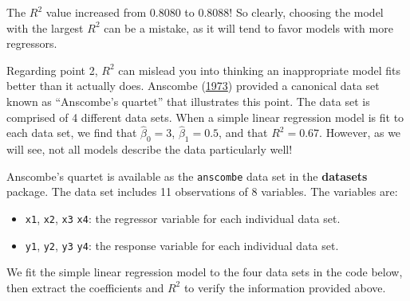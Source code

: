 \documentclass[
]{book}
\providecommand{\tightlist}{%
  \setlength{\itemsep}{0pt}\setlength{\parskip}{0pt}}
\theoremstyle{definition}
\theoremstyle{definition}
\theoremstyle{definition}
\theoremstyle{definition}
\theoremstyle{remark}
\begin{document}
The \(R^2\) value increased from 0.8080 to 0.8088! So clearly, choosing the model with the largest \(R^2\) can be a mistake, as it will tend to favor models with more regressors.

Regarding point 2, \(R^2\) can mislead you into thinking an inappropriate model fits better than it actually does. Anscombe (\protect\hyperlink{ref-anscombe1973graphs}{1973}) provided a canonical data set known as ``Anscombe's quartet'' that illustrates this point. The data set is comprised of 4 different data sets. When a simple linear regression model is fit to each data set, we find that \(\hat{\beta}_0=3\), \(\hat{\beta}_1=0.5\), and that \(R^2=0.67\). However, as we will see, not all models describe the data particularly well!

Anscombe's quartet is available as the \texttt{anscombe} data set in the \textbf{datasets} package. The data set includes 11 observations of
8 variables. The variables are:

\begin{itemize}
\tightlist
\item
  \texttt{x1}, \texttt{x2}, \texttt{x3} \texttt{x4}: the regressor variable for each individual data set.
\item
  \texttt{y1}, \texttt{y2}, \texttt{y3} \texttt{y4}: the response variable for each individual data set.
\end{itemize}

We fit the simple linear regression model to the four data sets in the code below, then extract the coefficients and \(R^2\) to verify the information provided above.
\end{document}
